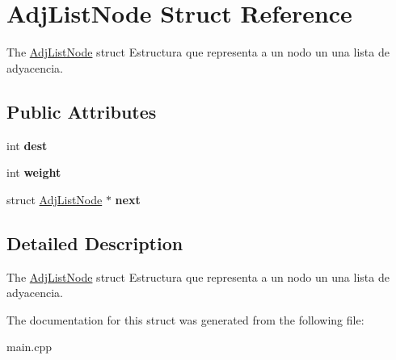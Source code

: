 \hypertarget{struct_adj_list_node}{}\section{Adj\+List\+Node Struct Reference}
\label{struct_adj_list_node}


The \hyperlink{struct_adj_list_node}{Adj\+List\+Node} struct Estructura que representa a un nodo un una lista de adyacencia.  


\subsection*{Public Attributes}
\begin{DoxyCompactItemize}
\item 
\mbox{\label{struct_adj_list_node_a5e3a8cdea9900b927f140f21685d35c0}} 
int {\bfseries dest}
\item 
\mbox{\label{struct_adj_list_node_ac1c361e92cf8d6da8bae9a0802169643}} 
int {\bfseries weight}
\item 
\mbox{\label{struct_adj_list_node_ad07931f1bcb5ab15b9baf380a118242c}} 
struct \hyperlink{struct_adj_list_node}{Adj\+List\+Node} $\ast$ {\bfseries next}
\end{DoxyCompactItemize}


\subsection{Detailed Description}
The \hyperlink{struct_adj_list_node}{Adj\+List\+Node} struct Estructura que representa a un nodo un una lista de adyacencia. 

The documentation for this struct was generated from the following file\+:\begin{DoxyCompactItemize}
\item 
main.\+cpp\end{DoxyCompactItemize}
